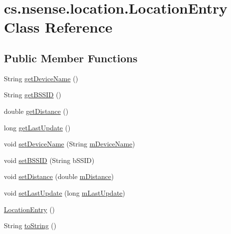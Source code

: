 \hypertarget{classcs_1_1nsense_1_1location_1_1_location_entry}{\section{cs.\-nsense.\-location.\-Location\-Entry Class Reference}
\label{classcs_1_1nsense_1_1location_1_1_location_entry}
}
\subsection*{Public Member Functions}
\begin{DoxyCompactItemize}
\item 
String \hyperlink{classcs_1_1nsense_1_1location_1_1_location_entry_ad686db95f5ad8fb5663e57b917d70c62}{get\-Device\-Name} ()
\item 
String \hyperlink{classcs_1_1nsense_1_1location_1_1_location_entry_a3aff963451c33087821b2d431cd6c3e2}{get\-B\-S\-S\-I\-D} ()
\item 
double \hyperlink{classcs_1_1nsense_1_1location_1_1_location_entry_a84fdb7a494e72003ef6bc3de47270333}{get\-Distance} ()
\item 
long \hyperlink{classcs_1_1nsense_1_1location_1_1_location_entry_a605e5175f5b59558692d7001ccc313d2}{get\-Last\-Update} ()
\item 
void \hyperlink{classcs_1_1nsense_1_1location_1_1_location_entry_a8011a2888d0a92091a28ed70d8d6c096}{set\-Device\-Name} (String \hyperlink{classcs_1_1nsense_1_1location_1_1_location_entry_ad182b6828ce42fc7a16dd8f09b0e2f80}{m\-Device\-Name})
\item 
void \hyperlink{classcs_1_1nsense_1_1location_1_1_location_entry_a30769f3dfb0c8114347e1323a57d8a6b}{set\-B\-S\-S\-I\-D} (String b\-S\-S\-I\-D)
\item 
void \hyperlink{classcs_1_1nsense_1_1location_1_1_location_entry_a858bbb08589851b5099b3d883bdbb3c4}{set\-Distance} (double \hyperlink{classcs_1_1nsense_1_1location_1_1_location_entry_a72467c3e40a253ebfa6785bb9d0272fc}{m\-Distance})
\item 
void \hyperlink{classcs_1_1nsense_1_1location_1_1_location_entry_a2c3d194ac89d8a2d24d4667e5855e6af}{set\-Last\-Update} (long \hyperlink{classcs_1_1nsense_1_1location_1_1_location_entry_ad9c3032440640ea31e08fd107c2f2efe}{m\-Last\-Update})
\item 
\hyperlink{classcs_1_1nsense_1_1location_1_1_location_entry_ad4e74828a26945346e935392cdb9c4a0}{Location\-Entry} ()
\item 
String \hyperlink{classcs_1_1nsense_1_1location_1_1_location_entry_acb43a1828d710170f7136750d6501734}{to\-String} ()
\end{DoxyCompactItemize}
